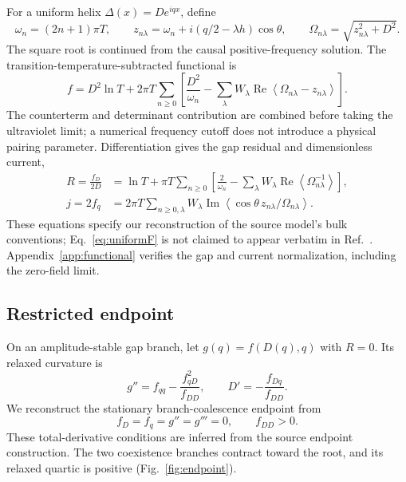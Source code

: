 \documentclass[11pt,a4paper]{article}
\newcommand{\av}[1]{\left\langle #1\right\rangle}
\begin{document}
For a uniform helix $\Delta(x)=De^{iqx}$, define
\begin{equation}\label{eq:doppler}
 \omega_n=(2n+1)\pi T,\qquad
 z_{n\lambda}=\omega_n+i(q/2-\lambda h)\cos\theta,
 \qquad\Omega_{n\lambda}=\sqrt{z_{n\lambda}^2+D^2}.
\end{equation}
The square root is continued from the causal positive-frequency solution. The transition-temperature-subtracted functional is
\begin{equation}\label{eq:uniformF}
 f=D^2\ln T+2\pi T\sum_{n\ge0}
 \left[\frac{D^2}{\omega_n}-\sum_\lambda W_\lambda
 \operatorname{Re}\av{\Omega_{n\lambda}-z_{n\lambda}}\right].
\end{equation}
The counterterm and determinant contribution are combined before taking the ultraviolet limit; a numerical frequency cutoff does not introduce a physical pairing parameter. Differentiation gives the gap residual and dimensionless current,
\begin{align}\label{eq:gap}
 R=\frac{f_D}{2D}&=\ln T+\pi T\sum_{n\ge0}
 \left[\frac{2}{\omega_n}-\sum_\lambda W_\lambda
 \operatorname{Re}\av{\Omega_{n\lambda}^{-1}}\right],\\
 j=2f_q&=2\pi T\sum_{n\ge0,\lambda}W_\lambda
 \operatorname{Im}\av{\cos\theta\,z_{n\lambda}/\Omega_{n\lambda}}.\label{eq:current}
\end{align}
These equations specify our reconstruction of the source model's bulk conventions; Eq.~\eqref{eq:uniformF} is not claimed to appear verbatim in Ref.~\cite{Zhuang2026}. Appendix~\ref{app:functional} verifies the gap and current normalization, including the zero-field limit.

\subsection{Restricted endpoint}
On an amplitude-stable gap branch, let $g(q)=f(D(q),q)$ with $R=0$. Its relaxed curvature is
\begin{equation}\label{eq:schur}
 g''=f_{qq}-\frac{f_{qD}^2}{f_{DD}},\qquad D'=-\frac{f_{Dq}}{f_{DD}}.
\end{equation}
We reconstruct the stationary branch-coalescence endpoint from
\begin{equation}\label{eq:endpoint}
 f_D=f_q=g''=g'''=0,\qquad f_{DD}>0.
\end{equation}
These total-derivative conditions are inferred from the source endpoint construction. The two coexistence branches contract toward the root, and its relaxed quartic is positive (Fig.~\ref{fig:endpoint}).
\end{document}
